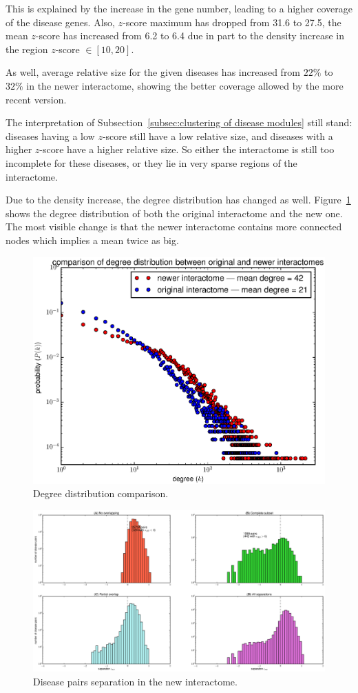 \documentclass[letterpaper]{article}
\begin{document}
	This is explained by the increase in the gene number, leading to a higher coverage of the disease genes. Also, $z$-score
	maximum has dropped from 31.6 to 27.5, the mean $z$-score has increased from 6.2 to 6.4 due in part to the density
	increase in the region $z$-score $\in [10, 20]$.

	As well, average relative size for the given diseases has increased from $22\%$ to $32\%$ in the newer interactome,
	showing the better coverage allowed by the more recent version.

	The interpretation of Subsection~\ref{subsec:clustering of disease modules} still stand: diseases having a low $z$-score still
	have a low relative size, and diseases with a higher $z$-score have a higher relative size. So either the interactome is still
	too incomplete for these diseases, or they lie in very sparse regions of the interactome.

	Due to the density increase, the degree distribution has changed as well. Figure~\ref{fig:degree distribution comparison}
	shows the degree distribution of both the original interactome and the new one. The most visible change is that the newer
	interactome contains more connected nodes which implies a mean twice as big.

	\begin{figure}[!h]
		\includegraphics[width=.5\textwidth]{images/degree_distributions_comparison.eps}
		\caption{Degree distribution comparison.\label{fig:degree distribution comparison}}
	\end{figure}

	\begin{figure}[!t]
		\hspace{-1.8cm}
		\vspace{-1cm}
		\includegraphics[scale=.35]{images/new_interactome_s_AB_histogram.eps}
		\caption{Disease pairs separation in the new interactome.\label{fig:new interactome s_AB}}
	\end{figure}
\end{document}
